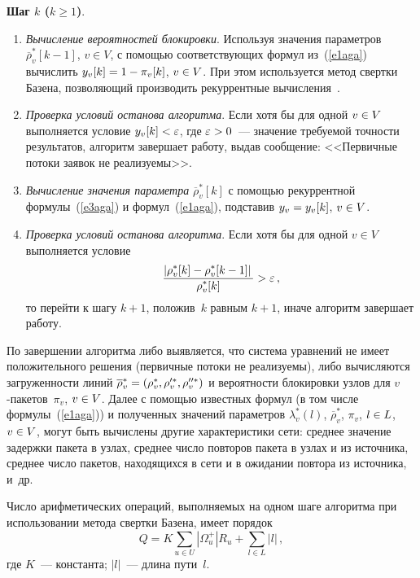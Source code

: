 \begin{multicols}{2}
     \textbf{Шаг $k$ ($k\geq 1$)}.
     \begin{enumerate}[1.]
\item \textit{Вычисление вероятностей блокировки}. Используя значения 
параметров $\overline{\rho}_v^*[k-1]$, $v\in V$, с\linebreak
помощью 
соответствующих формул из~(\ref{e1aga}) вы\-чис\-лить $y_v[k]\hm=1-\pi_v[k]$, 
$v\hm\in V$. При этом используется метод свертки Базена, позволяющий 
производить рекуррентные вычисления~\cite{3aga}.
\item \textit{Проверка условий останова алгоритма}. Если хотя бы для одной 
$v\hm\in V$ выполняется условие $y_v[k]\hm <\varepsilon$, где 
$\varepsilon\hm >0$~--- значение требуемой точности результатов, алгоритм 
завершает работу, выдав сообщение: <<Первичные потоки заявок не 
реализуемы>>. 
\item \textit{Вычисление значения параметра} 
$\overline{\rho}_v^*[k]$ с по\-мощью рекуррентной формулы~(\ref{e3aga}) и 
формул~(\ref{e1aga}), подставив $y_v\hm=y_v[k]$, $v\hm\in V$.
\item \textit{Проверка условий останова алгоритма}. Если хотя бы для одной 
$v\in V$ выполняется условие
$$
\displaystyle\frac{\displaystyle \left\vert \rho^*_v[k]-\rho^*_v[k-1]\right\vert\mathstrut}{\displaystyle \rho_v^*[k]\mathstrut}>\varepsilon\,,
$$
то перейти к шагу $k+1$, положив~$k$ равным $k+1$, иначе алгоритм 
завершает работу.
     \end{enumerate}
     
     По завершении алгоритма либо выявляется, что система уравнений не 
имеет положительного решения (первичные потоки не реализуемы), либо 
вычисляются загруженности линий $\overline{\rho}_v^*\hm=\left(\rho^*_v, 
\rho_v^{\prime *}, \rho_v^{\prime\prime *}\right)$ и вероятности блокировки узлов 
для $v$-пакетов~$\pi_v$, $v\hm\in V$. Далее с помощью известных формул 
(в том числе формулы~(\ref{e1aga})) и полученных значений параметров 
$\lambda^*_v(l)$, $\overline{\rho}_v^*$, $\pi_v$, $l\hm\in L$, $v\hm\in V$, 
могут быть вычислены другие характеристики сети: среднее значение 
задержки пакета в узлах, среднее число повторов пакета в узлах и из 
источника, среднее число пакетов, находящихся в сети и в ожидании повтора 
из источника, и~др. 

\columnbreak
   
   Число арифметических операций, выпол\-ня\-емых на одном шаге алгоритма 
при использовании метода свертки Базена, имеет порядок
   $$
   Q=K\sum\limits_{u\in U}\left\vert \Omega_u^+\right\vert 
R_u+\sum\limits_{l\in L}\left\vert l\right\vert\,,
   $$
где $K$~--- константа; $\vert l\vert$~--- длина пути~$l$.
     

\end{multicols}
